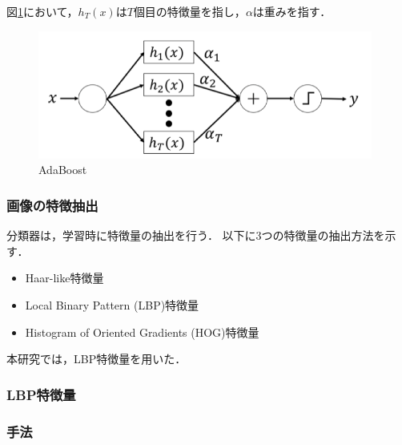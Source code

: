 図\ref{adaboost}において，$h_T(x)$は$T$個目の特徴量を指し，$\alpha$は重みを指す．

\vspace{1.5cm}


\begin{figure}[h]
    \centering
    \includegraphics[width=11cm]{image/adaboost.png}
    \caption{AdaBoost\cite{adafig}}
  \label{adaboost}
\end{figure}


\subsubsection{画像の特徴抽出}
分類器は，学習時に特徴量の抽出を行う． 
以下に3つの特徴量の抽出方法を示す．

\begin{itemize}
    \item Haar-like特徴量
    \item Local Binary Pattern (LBP)特徴量
    \item Histogram of Oriented Gradients (HOG)特徴量
\end{itemize}

本研究では，LBP特徴量を用いた．

\subsubsection{LBP特徴量}


\clearpage
\subsubsection{手法}